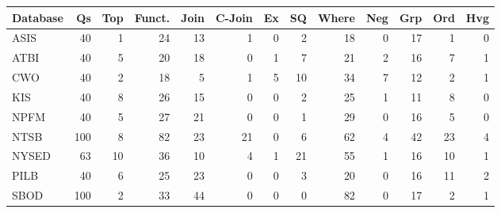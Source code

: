 \begin{tabular}{lrrrrrrrrrrrr}
\toprule
Database & Qs & Top & Funct. & Join & C-Join & Ex & SQ & Where & Neg & Grp & Ord & Hvg \\
\midrule
ASIS & 40 & 1 & 24 & 13 & 1 & 0 & 2 & 18 & 0 & 17 & 1 & 0 \\
ATBI & 40 & 5 & 20 & 18 & 0 & 1 & 7 & 21 & 2 & 16 & 7 & 1 \\
CWO & 40 & 2 & 18 & 5 & 1 & 5 & 10 & 34 & 7 & 12 & 2 & 1 \\
KIS & 40 & 8 & 26 & 15 & 0 & 0 & 2 & 25 & 1 & 11 & 8 & 0 \\
NPFM & 40 & 5 & 27 & 21 & 0 & 0 & 1 & 29 & 0 & 16 & 5 & 0 \\
NTSB & 100 & 8 & 82 & 23 & 21 & 0 & 6 & 62 & 4 & 42 & 23 & 4 \\
NYSED & 63 & 10 & 36 & 10 & 4 & 1 & 21 & 55 & 1 & 16 & 10 & 1 \\
PILB & 40 & 6 & 25 & 23 & 0 & 0 & 3 & 20 & 0 & 16 & 11 & 2 \\
SBOD & 100 & 2 & 33 & 44 & 0 & 0 & 0 & 82 & 0 & 17 & 2 & 1 \\
\bottomrule
\end{tabular}
